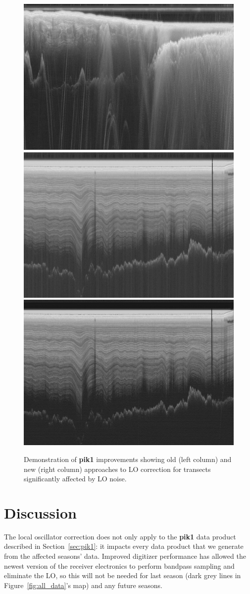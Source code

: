 \documentclass[11pt]{article}
\newcommand{\secref}[1]{Section~\ref{#1}}
\newcommand{\figref}[1]{Figure~\ref{#1}}
\begin{document}
\begin{figure}[]
\includegraphics[width=0.495\columnwidth]{figures/THW_new.jpg} \\
\vspace{2pt}
\includegraphics[width=0.495\columnwidth]{figures/VCD_old.jpg}
\includegraphics[width=0.495\columnwidth]{figures/VCD_new.jpg}
\caption[]{Demonstration of \textbf{pik1} improvements showing old (left column) and new (right column) approaches to LO correction for transects significantly affected by LO noise.}
\label{fig:LO_results}
\end{figure}

\section{Discussion}


The local oscillator correction does not only apply to the \textbf{pik1} data product described in \secref{sec:pik1}: it impacts every data product that we generate from the affected seasons' data. Improved digitizer performance has allowed the newest version of the receiver electronics to perform bandpass sampling and eliminate the LO, so this will not be needed for last season (dark grey lines in \figref{fig:all_data}'s map) and any future seasons.
\end{document}
